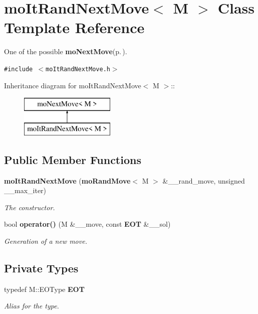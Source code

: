 \section{mo\-It\-Rand\-Next\-Move$<$ M $>$ Class Template Reference}
\label{classmo_it_rand_next_move}
One of the possible {\bf mo\-Next\-Move}{\rm (p.\,\pageref{classmo_next_move})}.  


{\tt \#include $<$mo\-It\-Rand\-Next\-Move.h$>$}

Inheritance diagram for mo\-It\-Rand\-Next\-Move$<$ M $>$::\begin{figure}[H]
\begin{center}
\leavevmode
\includegraphics[height=2cm]{classmo_it_rand_next_move}
\end{center}
\end{figure}
\subsection*{Public Member Functions}
\begin{CompactItemize}
\item 
{\bf mo\-It\-Rand\-Next\-Move} ({\bf mo\-Rand\-Move}$<$ M $>$ \&\_\-\_\-rand\_\-move, unsigned \_\-\_\-max\_\-iter)
\begin{CompactList}\small\item\em The constructor. \item\end{CompactList}\item 
bool {\bf operator()} (M \&\_\-\_\-move, const {\bf EOT} \&\_\-\_\-sol)
\begin{CompactList}\small\item\em Generation of a new move. \item\end{CompactList}\end{CompactItemize}
\subsection*{Private Types}
\begin{CompactItemize}
\item 
typedef M::EOType {\bf EOT}\label{classmo_it_rand_next_move_ee666007fc494bf4a5f0cd065e5671cf}

\begin{CompactList}\small\item\em Alias for the type. \item\end{CompactList}\end{CompactItemize}
